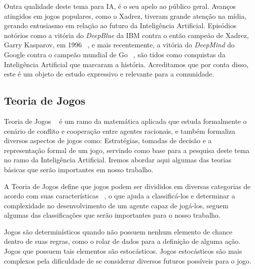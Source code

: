  Outra qualidade deste tema para IA, é o seu apelo ao público geral. Avanços atingidos em jogos populares, como o Xadrez, tiveram grande atenção na mídia, gerando entusiasmo em relação ao futuro da Inteligência Artificial. Episódios notórios como a vitória do \textit{DeepBlue} da IBM contra o então campeão de Xadrez, Garry Kasparov, em 1996 ~\cite{DEEPBLUEIBM}, e mais recentemente, a vitória do \textit{DeepMind} do Google contra o campeão mundial de Go ~\cite{DEEPMINDGO}, são tidos como conquistas da Inteligência Artificial que marcaram a história. Acreditamos que por conta disso, este é um objeto de estudo expressivo e relevante para a comunidade.
 




\subsection{\label{sec:secao1.2}Teoria de Jogos}

Teoria de Jogos ~\cite{GAMETHEORYPRIMER} é um ramo da matemática aplicada que estuda formalmente o cenário de conflito e cooperação entre agentes racionais, e também formaliza diversos aspectos de jogos como: Estratégias, tomadas de decisão e a representação formal de um jogo, servindo como base para a pesquisa deste tema no ramo da Inteligência Artificial. Iremos abordar aqui algumas das teorias básicas que serão importantes em nosso trabalho.

A Teoria de Jogos define que jogos podem ser divididos em diversas categorias de acordo com suas características ~\cite{ARTIFICIALINTELLIGENCE4GAMES_TYPESOFGAMES}, o que ajuda a classificá-los e determinar a complexidade no desenvolvimento de um agente capaz de jogá-los, seguem algumas das classificações que serão importantes para o nosso trabalho.

Jogos são determinísticos quando não possuem nenhum elemento de chance dentro de suas regras, como o rolar de dados para a definição de alguma ação. Jogos que possuem tais elementos são estocásticos. Jogos estocásticos são mais complexos pela dificuldade de se considerar diversos futuros possíveis para o jogo.
 

